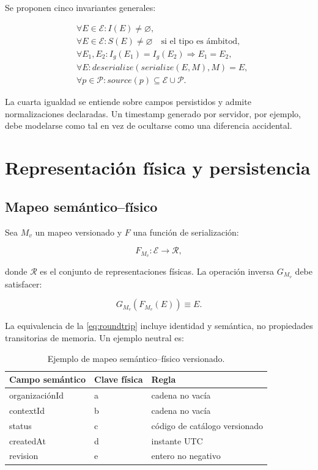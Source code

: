 Se proponen cinco invariantes generales:

\begin{align}
&\forall E\in\mathcal{E}: I(E)\neq\varnothing,\\
&\forall E\in\mathcal{E}: S(E)\neq\varnothing\quad\text{si el tipo es ámbitod},\\
&\forall E_1,E_2: I_g(E_1)=I_g(E_2)\Rightarrow E_1=E_2,\\
&\forall E: deserialize(serialize(E,M),M)=E,\\
&\forall p\in\mathcal{P}: source(p)\subseteq\mathcal{E}\cup\mathcal{P}.
\end{align}

La cuarta igualdad se entiende sobre campos persistidos y admite normalizaciones
declaradas. Un timestamp generado por servidor, por ejemplo, debe modelarse como tal en
vez de ocultarse como una diferencia accidental.

\chapter{Representación física y persistencia}
\label{ch:persistencia}

\section{Mapeo semántico--físico}

Sea $M_v$ un mapeo versionado y $F$ una función de serialización:

\begin{equation}
F_{M_v}:\mathcal{E}\rightarrow\mathcal{R},
\end{equation}

donde $\mathcal{R}$ es el conjunto de representaciones físicas. La operación inversa
$G_{M_v}$ debe satisfacer:

\begin{equation}
G_{M_v}(F_{M_v}(E))\equiv E.
\label{eq:roundtrip}
\end{equation}

La equivalencia de la \cref{eq:roundtrip} incluye identidad y semántica, no propiedades
transitorias de memoria. Un ejemplo neutral es:

\begin{table}[H]
\centering
\caption{Ejemplo de mapeo semántico--físico versionado.}
\label{tab:fieldmap}
\begin{tabular}{lll}
\toprule
Campo semántico & Clave física & Regla \\
\midrule
organizaciónId & a & cadena no vacía \\
contextId & b & cadena no vacía \\
status & c & código de catálogo versionado \\
createdAt & d & instante UTC \\
revision & e & entero no negativo \\
\bottomrule
\end{tabular}
\end{table}

